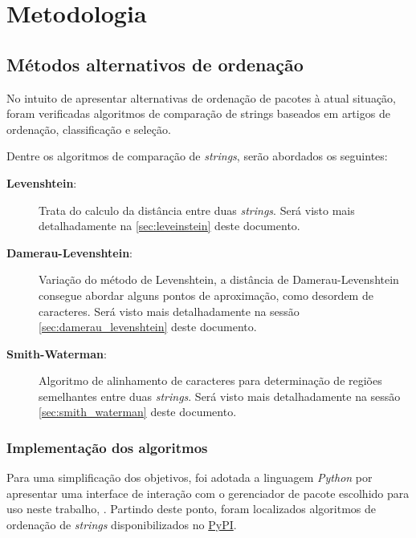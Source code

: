 \chapter{\nmu Metodologia} %
\label{cha:metodologia}



\section{Métodos alternativos de ordenação} %
\label{sec:m_todos_alternativos_de_ordena_o}

No intuito de apresentar alternativas de ordenação de pacotes à atual situação, foram verificadas algoritmos de comparação de strings baseados em artigos de ordenação, classificação e seleção.

Dentre os algoritmos de comparação de \textit{strings}, serão abordados os seguintes:

\begin{description}
	\item [\textbf{Levenshtein}:] 
	Trata do calculo da distância entre duas \textit{strings}. Será visto mais detalhadamente na \autoref{sec:leveinstein} deste documento.
%
	\item [\textbf{Damerau-Levenshtein}:]
	Variação do método de Levenshtein, a distância de Damerau-Levenshtein consegue abordar alguns pontos de aproximação, como desordem de caracteres. Será visto mais detalhadamente na sessão \autoref{sec:damerau_levenshtein} deste documento.
%
	\item [\textbf{Smith-Waterman}:]
	Algoritmo de alinhamento de caracteres para determinação de regiões semelhantes entre duas \textit{strings}. Será visto mais detalhadamente na sessão \autoref{sec:smith_waterman} deste documento.

\end{description}

\subsection{Implementação dos algoritmos} %
\label{sub:implementa_o_dos_algoritmos}

Para uma simplificação dos objetivos, foi adotada a linguagem \textit{Python} por apresentar uma interface de interação com o gerenciador de pacote escolhido para uso neste trabalho, . Partindo deste ponto, foram localizados algoritmos de ordenação de \textit{strings} disponibilizados no \href{https://pypi.python.org/}{PyPI}.


